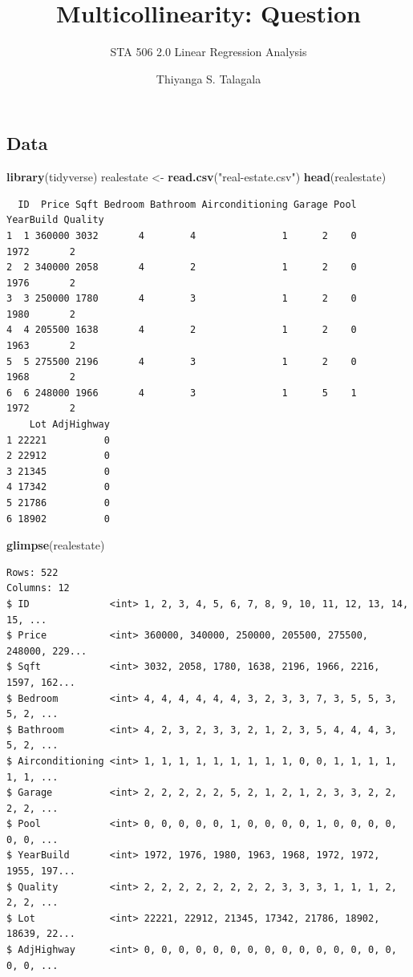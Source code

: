 \documentclass[]{article}
\title{Multicollinearity: Question}
\subtitle{STA 506 2.0 Linear Regression Analysis}
\author{Thiyanga S. Talagala}
\date{}
\newenvironment{Shaded}{\begin{snugshade}}{\end{snugshade}}
\newcommand{\KeywordTok}[1]{\textcolor[rgb]{0.13,0.29,0.53}{\textbf{#1}}}
\newcommand{\NormalTok}[1]{#1}
\newcommand{\StringTok}[1]{\textcolor[rgb]{0.31,0.60,0.02}{#1}}
\begin{document}
\maketitle

\hypertarget{data}{%
\subsection{Data}\label{data}}

\begin{Shaded}
\begin{Highlighting}[]
\KeywordTok{library}\NormalTok{(tidyverse)}
\NormalTok{realestate <-}\StringTok{ }\KeywordTok{read.csv}\NormalTok{(}\StringTok{"real-estate.csv"}\NormalTok{)}
\KeywordTok{head}\NormalTok{(realestate)}
\end{Highlighting}
\end{Shaded}

\begin{verbatim}
  ID  Price Sqft Bedroom Bathroom Airconditioning Garage Pool YearBuild Quality
1  1 360000 3032       4        4               1      2    0      1972       2
2  2 340000 2058       4        2               1      2    0      1976       2
3  3 250000 1780       4        3               1      2    0      1980       2
4  4 205500 1638       4        2               1      2    0      1963       2
5  5 275500 2196       4        3               1      2    0      1968       2
6  6 248000 1966       4        3               1      5    1      1972       2
    Lot AdjHighway
1 22221          0
2 22912          0
3 21345          0
4 17342          0
5 21786          0
6 18902          0
\end{verbatim}

\begin{Shaded}
\begin{Highlighting}[]
\KeywordTok{glimpse}\NormalTok{(realestate)}
\end{Highlighting}
\end{Shaded}

\begin{verbatim}
Rows: 522
Columns: 12
$ ID              <int> 1, 2, 3, 4, 5, 6, 7, 8, 9, 10, 11, 12, 13, 14, 15, ...
$ Price           <int> 360000, 340000, 250000, 205500, 275500, 248000, 229...
$ Sqft            <int> 3032, 2058, 1780, 1638, 2196, 1966, 2216, 1597, 162...
$ Bedroom         <int> 4, 4, 4, 4, 4, 4, 3, 2, 3, 3, 7, 3, 5, 5, 3, 5, 2, ...
$ Bathroom        <int> 4, 2, 3, 2, 3, 3, 2, 1, 2, 3, 5, 4, 4, 4, 3, 5, 2, ...
$ Airconditioning <int> 1, 1, 1, 1, 1, 1, 1, 1, 1, 0, 0, 1, 1, 1, 1, 1, 1, ...
$ Garage          <int> 2, 2, 2, 2, 2, 5, 2, 1, 2, 1, 2, 3, 3, 2, 2, 2, 2, ...
$ Pool            <int> 0, 0, 0, 0, 0, 1, 0, 0, 0, 0, 1, 0, 0, 0, 0, 0, 0, ...
$ YearBuild       <int> 1972, 1976, 1980, 1963, 1968, 1972, 1972, 1955, 197...
$ Quality         <int> 2, 2, 2, 2, 2, 2, 2, 2, 3, 3, 3, 1, 1, 1, 2, 2, 2, ...
$ Lot             <int> 22221, 22912, 21345, 17342, 21786, 18902, 18639, 22...
$ AdjHighway      <int> 0, 0, 0, 0, 0, 0, 0, 0, 0, 0, 0, 0, 0, 0, 0, 0, 0, ...
\end{verbatim}
\end{document}
